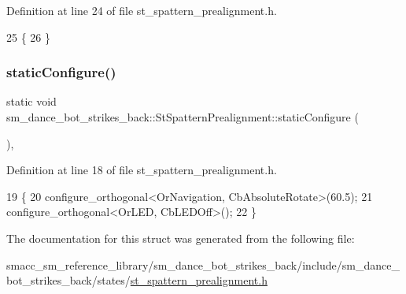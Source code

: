Definition at line 24 of file st\+\_\+spattern\+\_\+prealignment.\+h.


\begin{DoxyCode}
25   \{ 
26   \}
\end{DoxyCode}
\mbox{\label{structsm__dance__bot__strikes__back_1_1StSpatternPrealignment_a2e36a50e251ee0b35a8187dca30d52b2}} 
\subsubsection{\texorpdfstring{static\+Configure()}{staticConfigure()}}
{\footnotesize\ttfamily static void sm\+\_\+dance\+\_\+bot\+\_\+strikes\+\_\+back\+::\+St\+Spattern\+Prealignment\+::static\+Configure (\begin{DoxyParamCaption}{ }\end{DoxyParamCaption})\hspace{0.3cm}{\ttfamily [inline]}, {\ttfamily [static]}}



Definition at line 18 of file st\+\_\+spattern\+\_\+prealignment.\+h.


\begin{DoxyCode}
19   \{
20     configure\_orthogonal<OrNavigation, CbAbsoluteRotate>(60.5);
21     configure\_orthogonal<OrLED, CbLEDOff>();
22   \}
\end{DoxyCode}


The documentation for this struct was generated from the following file\+:\begin{DoxyCompactItemize}
\item 
smacc\+\_\+sm\+\_\+reference\+\_\+library/sm\+\_\+dance\+\_\+bot\+\_\+strikes\+\_\+back/include/sm\+\_\+dance\+\_\+bot\+\_\+strikes\+\_\+back/states/\hyperlink{sm__dance__bot__strikes__back_2include_2sm__dance__bot__strikes__back_2states_2st__spattern__prealignment_8h}{st\+\_\+spattern\+\_\+prealignment.\+h}\end{DoxyCompactItemize}
